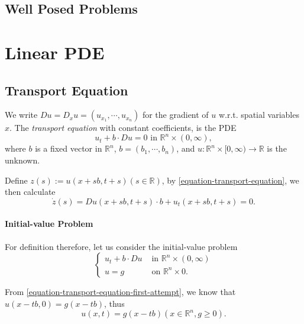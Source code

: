 \subsection{Well Posed Problems}
\label{subsection-well-posed-problems}

\section{Linear PDE}
\label{section-linear-pde}

\subsection{Transport Equation}
\label{subsection-transport-equation}

We write \( D u = D_x u = (u_{x_1}, \cdots, u_{x_n}) \) for the gradient of \( u \) w.r.t. spatial variables \( x \).
The \emph{transport equation} with constant coefficients, is the PDE
\begin{equation}
  u_t + b \cdot Du = 0 \text{ in } \mathbb{R}^n \times (0, \infty),
  \label{equation-transport-equation}
\end{equation}
where \( b \) is a fixed vector in \( \mathbb{R}^n \), \( b = (b_1, \cdots, b_n) \), and \( u: \mathbb{R}^n \times [0, \infty) \to \mathbb{R} \) is the unknown.

Define \( z(s) := u(x + sb, t + s)(s \in \mathbb{R}) \), by \eqref{equation-transport-equation}, we then calculate
\begin{equation}
  \dot{z}(s) = Du(x + sb, t + s) \cdot b + u_t(x + sb, t + s) = 0.
  \label{equation-transport-equation-first-attempt}
\end{equation}

\paragraph{Initial-value Problem}

For definition therefore, let us consider the initial-value problem
\begin{equation}
  \begin{cases}
  u_t + b \cdot Du & \text{ in } \mathbb{R}^n \times (0, \infty)\\
  u = g & \text{ on } \mathbb{R}^n \times 0.
  \end{cases}
  \label{equation-transport-equation-with-initial-value}
\end{equation}

From \eqref{equation-transport-equation-first-attempt}, we know that \( u(x - tb, 0) = g(x - tb) \), thus
\begin{equation}
  u(x, t) = g(x - tb) (x \in \mathbb{R}^n, g \geq 0).
  \label{equation-solution-transport-equation-with-initial-value}
\end{equation}

